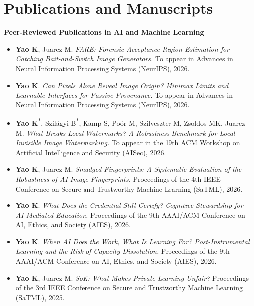 \documentclass[10pt,a4paper]{article}
\begin{document}
\section*{Publications and Manuscripts}
\textbf{Peer-Reviewed Publications in AI and Machine Learning}
\begin{itemize}
    \item \textbf{Yao K}, Juarez M. \textit{FARE: Forensic Acceptance Region Estimation for Catching Bait-and-Switch Image Generators.} To appear in Advances in Neural Information Processing Systems (NeurIPS), 2026.
    \item \textbf{Yao K}. \textit{Can Pixels Alone Reveal Image Origin? Minimax Limits and Learnable Interfaces for Passive Provenance.} To appear in Advances in Neural Information Processing Systems (NeurIPS), 2026.
    \item \textbf{Yao K}\textsuperscript{*}, Szil\'{a}gyi B\textsuperscript{*}, Kamp S, Po\'{o}r M, Szilveszter M, Zsoldos MK, Juarez M. \textit{What Breaks Local Watermarks? A Robustness Benchmark for Local Invisible Image Watermarking.} To appear in the 19th ACM Workshop on Artificial Intelligence and Security (AISec), 2026.
    \item \textbf{Yao K}, Juarez M. \textit{Smudged Fingerprints: A Systematic Evaluation of the Robustness of AI Image Fingerprints.} Proceedings of the 4th IEEE Conference on Secure and Trustworthy Machine Learning (SaTML), 2026.
    \item \textbf{Yao K}. \textit{What Does the Credential Still Certify? Cognitive Stewardship for AI-Mediated Education.} Proceedings of the 9th AAAI/ACM Conference on AI, Ethics, and Society (AIES), 2026.
    \item \textbf{Yao K}. \textit{When AI Does the Work, What Is Learning For? Post-Instrumental Learning and the Risk of Capacity Dissolution.} Proceedings of the 9th AAAI/ACM Conference on AI, Ethics, and Society (AIES), 2026.
    \item \textbf{Yao K}, Juarez M. \textit{SoK: What Makes Private Learning Unfair?} Proceedings of the 3rd IEEE Conference on Secure and Trustworthy Machine Learning (SaTML), 2025.
\end{itemize}
\end{document}
